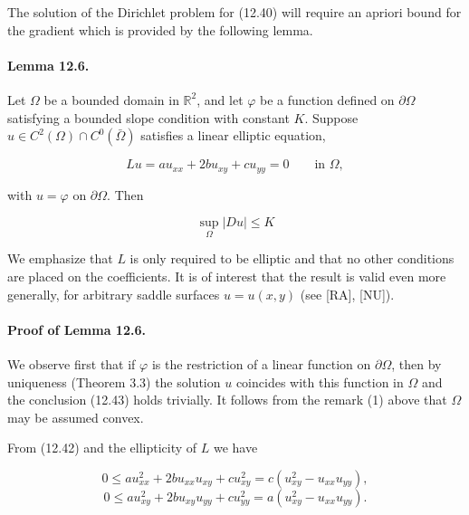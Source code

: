 
The solution of the Dirichlet problem for (12.40) will require an apriori bound
for the gradient which is provided by the following lemma.

\paragraph{Lemma 12.6.}
Let $\Omega$ be a bounded domain in $\mathbb{R}^2$, and let $\varphi$ be a function defined on
$\partial\Omega$ satisfying a bounded slope condition with constant $K$. Suppose $u\in C^2(\Omega)\cap C^0(\bar{\Omega})$
satisfies a linear elliptic equation,

\begin{equation}
\tag{12.42}
Lu = au_{xx} + 2bu_{xy} + cu_{yy} = 0 \qquad \text{in } \Omega,
\end{equation}

with $u=\varphi$ on $\partial\Omega$. Then

\begin{equation}
\tag{12.43}
\sup_{\Omega} |Du| \le K
\end{equation}

We emphasize that $L$ is only required to be elliptic and that no other conditions
are placed on the coefficients. It is of interest that the result is valid even more
generally, for arbitrary saddle surfaces $u=u(x,y)$ (see [RA], [NU]).

\paragraph{Proof of Lemma 12.6.}
We observe first that if $\varphi$ is the restriction of a linear function
on $\partial\Omega$, then by uniqueness (Theorem 3.3) the solution $u$ coincides with this function
in $\Omega$ and the conclusion (12.43) holds trivially. It follows from the remark (1)
above that $\Omega$ may be assumed convex.

From (12.42) and the ellipticity of $L$ we have

\[
0\le au_{xx}^2+2bu_{xx}u_{xy}+cu_{xy}^2=c(u_{xy}^2-u_{xx}u_{yy}),
\]
\[
0\le au_{xy}^2+2bu_{xy}u_{yy}+cu_{yy}^2=a(u_{xy}^2-u_{xx}u_{yy}).
\]

